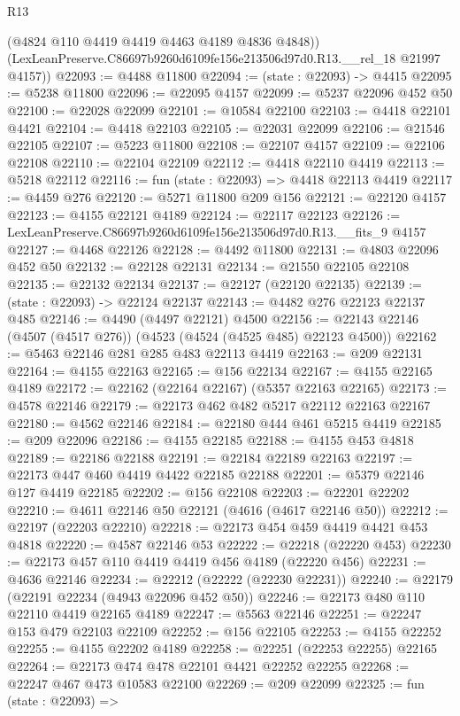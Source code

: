 \begin{lexlean}{R13}
\begin{coremodule}
        (@4824 @110 @4419 @4419 @4463 @4189 @4836 @4848))
      (LexLeanPreserve.C86697b9260d6109fe156e213506d97d0.R13.__rel_18 @21997 @4157))
@22093 := @4488 @11800
@22094 := (state : @22093) -> @4415
@22095 := @5238 @11800
@22096 := @22095 @4157
@22099 := @5237 @22096 @452 @50
@22100 := @22028 @22099
@22101 := @10584 @22100
@22103 := @4418 @22101 @4421
@22104 := @4418 @22103
@22105 := @22031 @22099
@22106 := @21546 @22105
@22107 := @5223 @11800
@22108 := @22107 @4157
@22109 := @22106 @22108
@22110 := @22104 @22109
@22112 := @4418 @22110 @4419
@22113 := @5218 @22112
@22116 := fun (state : @22093) => @4418 @22113 @4419
@22117 := @4459 @276
@22120 := @5271 @11800 @209 @156
@22121 := @22120 @4157
@22123 := @4155 @22121 @4189
@22124 := @22117 @22123
@22126 := LexLeanPreserve.C86697b9260d6109fe156e213506d97d0.R13.__fits_9 @4157
@22127 := @4468 @22126
@22128 := @4492 @11800
@22131 := @4803 @22096 @452 @50
@22132 := @22128 @22131
@22134 := @21550 @22105 @22108
@22135 := @22132 @22134
@22137 := @22127 (@22120 @22135)
@22139 := (state : @22093) -> @22124 @22137
@22143 := @4482 @276 @22123 @22137 @485
@22146 := @4490 (@4497 @22121) @4500
@22156 := @22143 @22146 (@4507 (@4517 @276)) (@4523 (@4524 (@4525 @485) @22123 @4500))
@22162 := @5463 @22146 @281 @285 @483 @22113 @4419
@22163 := @209 @22131
@22164 := @4155 @22163
@22165 := @156 @22134
@22167 := @4155 @22165 @4189
@22172 := @22162 (@22164 @22167) (@5357 @22163 @22165)
@22173 := @4578 @22146
@22179 := @22173 @462 @482 @5217 @22112 @22163 @22167
@22180 := @4562 @22146
@22184 := @22180 @444 @461 @5215 @4419
@22185 := @209 @22096
@22186 := @4155 @22185
@22188 := @4155 @453 @4818
@22189 := @22186 @22188
@22191 := @22184 @22189 @22163
@22197 := @22173 @447 @460 @4419 @4422 @22185 @22188
@22201 := @5379 @22146 @127 @4419 @22185
@22202 := @156 @22108
@22203 := @22201 @22202
@22210 := @4611 @22146 @50 @22121 (@4616 (@4617 @22146 @50))
@22212 := @22197 (@22203 @22210)
@22218 := @22173 @454 @459 @4419 @4421 @453 @4818
@22220 := @4587 @22146 @53
@22222 := @22218 (@22220 @453)
@22230 := @22173 @457 @110 @4419 @4419 @456 @4189 (@22220 @456)
@22231 := @4636 @22146
@22234 := @22212 (@22222 (@22230 @22231))
@22240 := @22179 (@22191 @22234 (@4943 @22096 @452 @50))
@22246 := @22173 @480 @110 @22110 @4419 @22165 @4189
@22247 := @5563 @22146
@22251 := @22247 @153 @479 @22103 @22109
@22252 := @156 @22105
@22253 := @4155 @22252
@22255 := @4155 @22202 @4189
@22258 := @22251 (@22253 @22255) @22165
@22264 := @22173 @474 @478 @22101 @4421 @22252 @22255
@22268 := @22247 @467 @473 @10583 @22100
@22269 := @209 @22099
@22325 := fun (state : @22093) =>

\end{coremodule}
\end{lexlean}
